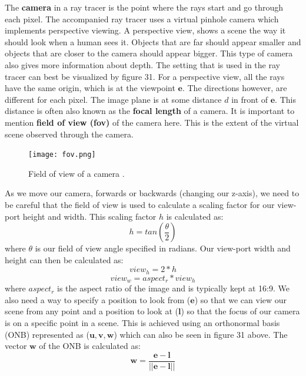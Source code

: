 \documentclass[11pt,a4paper]{article}
\begin{document}
	The \textbf{camera} in a ray tracer is the point where the rays start and go through each pixel. The accompanied ray tracer uses a virtual pinhole camera which implements perspective viewing. A perspective view, shows a scene the way it should look when a human sees it. Objects that are far should appear smaller and objects that are closer to the camera should appear bigger. This type of camera also gives more information about depth. The setting that is used in the ray tracer can best be visualized by figure 31.
	For a perspective view, all the rays have the same origin, which is at the viewpoint $\boldsymbol{e}$. The directions however, are different for each pixel. The image plane is at some distance $d$ in front of $\boldsymbol{e}$. This distance is often also known as the \textbf{focal length} of a camera. It is important to mention \textbf{field of view (fov)} of the camera here. This is the extent of the virtual scene observed through the camera. 
	\begin{figure}[H]
		\centering
		\captionsetup{justification=centering}
		\texttt{[image: fov.png]}\quad
		\caption{Field of view of a camera \protect\cite{fieldofview}.}
	\end{figure}
	\noindent
	As we move our camera, forwards or backwards (changing our z-axis), we need to be careful that the field of view is used to calculate a scaling factor for our view-port height and width. This scaling factor $h$ is calculated as:
	\begin{equation}
		h = tan\left(\frac{\theta}{2}\right)
	\end{equation}
	\noindent
	where $\theta$ is our field of view angle specified in radians. Our view-port width and height can then be calculated as:
	\begin{equation}
		view_{h} = 2 * h
	\end{equation}
	\begin{equation}
		view_{w} = aspect_{r} * view_{h}
	\end{equation}
	\noindent
	where $aspect_{r}$ is the aspect ratio of the image and is typically kept at 16:9. We also need a way to specify a position to look from ($\boldsymbol{e}$) so that we can view our scene from any point and a position to look at ($\boldsymbol{l}$) so that the focus of our camera is on a specific point in a scene. This is achieved using an orthonormal basis (ONB) represented as ($\boldsymbol{u, v, w}$) which can also be seen in figure 31 above. The vector $\boldsymbol{w}$ of the ONB is calculated as:
	\begin{equation}
		\boldsymbol{w} = \frac{\boldsymbol{e} - \boldsymbol{l}}{||\boldsymbol{e} - \boldsymbol{l}||}
	\end{equation}
\end{document}
